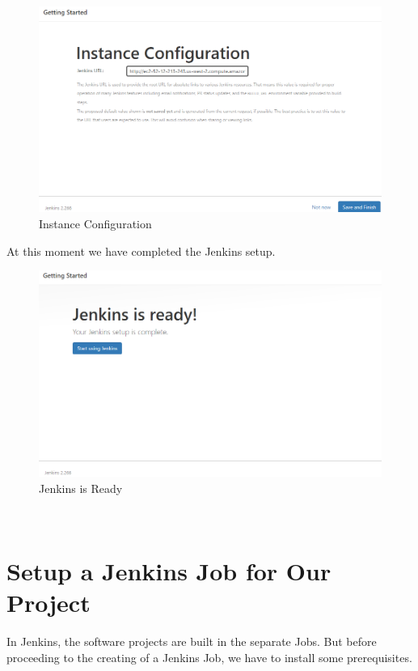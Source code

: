 \documentclass[12pt,a4paper,twoside]{article}
\begin{document}
\begin{figure}[H]
    \centering
        \includegraphics[width=15cm]{images-aws/25-jenkins-conf.png}
        \caption{Instance Configuration}
\end{figure}


At this moment we have completed the Jenkins setup.


\begin{figure}[H]
    \centering
        \includegraphics[width=15cm]{images-aws/26-jenkins-ready.png}
        \caption{Jenkins is Ready}
\end{figure}


~\newpage


\section{Setup a Jenkins Job for Our Project}


In Jenkins, the software projects are built in the separate Jobs. 
But before proceeding to the creating of a Jenkins Job, we have to install some prerequisites. 
\end{document}
